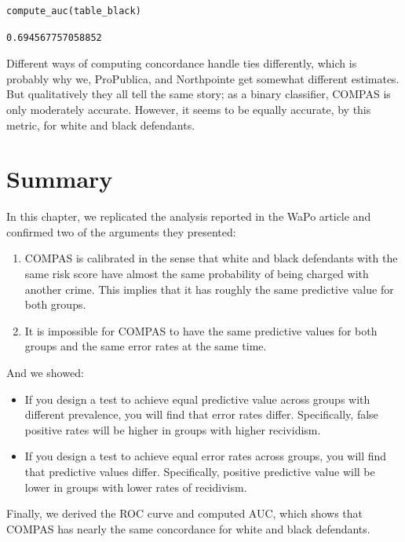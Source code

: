 \begin{lstlisting}[language=Python]
compute_auc(table_black)
\end{lstlisting}

\begin{lstlisting}[]
0.694567757058852
\end{lstlisting}

Different ways of computing concordance handle ties differently, which
is probably why we, ProPublica, and Northpointe get somewhat different
estimates. But qualitatively they all tell the same story; as a binary
classifier, COMPAS is only moderately accurate. However, it seems to be
equally accurate, by this metric, for white and black defendants.

\hypertarget{summary}{%
\section{Summary}\label{summary}}

In this chapter, we replicated the analysis reported in the WaPo article
and confirmed two of the arguments they presented:

\begin{enumerate}
\def\labelenumi{\arabic{enumi}.}
\item
  COMPAS is calibrated in the sense that white and black defendants with
  the same risk score have almost the same probability of being charged
  with another crime. This implies that it has roughly the same
  predictive value for both groups.
\item
  It is impossible for COMPAS to have the same predictive values for
  both groups and the same error rates at the same time.
\end{enumerate}

And we showed:

\begin{itemize}
\item
  If you design a test to achieve equal predictive value across groups
  with different prevalence, you will find that error rates differ.
  Specifically, false positive rates will be higher in groups with
  higher recividism.
\item
  If you design a test to achieve equal error rates across groups, you
  will find that predictive values differ. Specifically, positive
  predictive value will be lower in groups with lower rates of
  recidivism.
\end{itemize}

Finally, we derived the ROC curve and computed AUC, which shows that
COMPAS has nearly the same concordance for white and black defendants.

